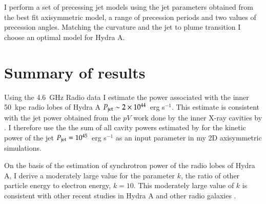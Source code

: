 I perform a set of precessing jet models using the jet parameters obtained from the best fit axisymmetric model, a range of precession periods and two values of precession angles. Matching the curvature and the jet to plume transition I choose an optimal model for Hydra A. 
 



\section{Summary of results}\label{int:sum}

Using the 4.6~GHz Radio data I estimate the power associated with the inner 50~kpc radio lobes of Hydra A $P_{\rm jet}\sim2 \times 10^{44}$~erg s$^{-1}$.  This estimate is consistent with the jet power obtained from the $pV$ work done by the  inner X-ray cavities by \citet{wise07}. I therefore use the the sum of all cavity powers estimated by \citet{wise07} for the kinetic power of the jet $P_{\rm jet} = 10^{45}$~erg s$^{-1}$ as an input parameter in my 2D axisymmetric simulations.

On the basis of the estimation of synchrotron power of the radio lobes of Hydra A, I derive a moderately large value for the parameter $k$, the ratio of other particle energy to electron energy, $k=10$. 
This moderately large value of $k$ is consistent with other recent studies in Hydra A and other radio galaxies \citep[e.g.][]{birzan08, hardcastle10}.

